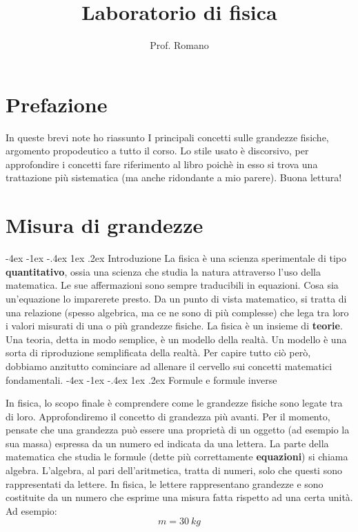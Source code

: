 \documentclass[12pt,a4paper,oneside]{book}
\title{Laboratorio di fisica}
\author{Prof. Romano}
\makeatletter
\renewcommand{\section}{\@startsection{section}{1}{\z@}
{-4ex \@plus -1ex \@minus -.4ex}
{1ex \@plus.2ex }
{\normalfont\large\sffamily\bfseries}}
\theoremstyle{esercizio}
\makeatother
\begin{document}
\maketitle
\tableofcontents
\chapter*{Prefazione}
In queste brevi note ho riassunto I principali concetti sulle grandezze fisiche, argomento propodeutico a tutto il corso. Lo stile usato è discorsivo, per approfondire i concetti fare riferimento al libro poichè in esso si trova una trattazione più sistematica (ma anche ridondante a mio parere). Buona lettura!
\chapter{Misura di grandezze}
\section{Introduzione}
La fisica è una scienza sperimentale di tipo \textbf{quantitativo}, ossia una scienza che studia la natura attraverso l'uso della matematica. Le sue affermazioni sono sempre traducibili in equazioni. Cosa sia un'equazione lo imparerete presto. Da un punto di vista matematico, si tratta di una relazione (spesso algebrica, ma ce ne sono di più complesse) che lega tra loro i valori misurati di una o più grandezze fisiche. La fisica è un insieme di \textbf{teorie}. Una teoria, detta in modo semplice, è un modello della realtà. Un modello è una sorta di riproduzione semplificata della realtà. Per capire tutto ciò però, dobbiamo anzitutto cominciare ad allenare il cervello sui concetti matematici fondamentali.
\section{Formule e formule inverse}

In fisica, lo scopo finale è comprendere come le grandezze fisiche  sono legate tra di loro. Approfondiremo il concetto di grandezza più avanti. Per il momento, pensate che una grandezza può essere una proprietà di un oggetto (ad esempio la sua massa) espressa da un numero ed indicata da una lettera. La parte della matematica che studia le formule (dette più correttamente \textbf{equazioni}) si chiama algebra. L'algebra, al pari dell'aritmetica, tratta di numeri, solo che questi sono rappresentati da lettere. In fisica, le lettere rappresentano grandezze e sono costituite da un numero che esprime una misura fatta rispetto ad una certa unità. Ad esempio:
\[
m=\SI{30}{kg}
\]
\end{document}
